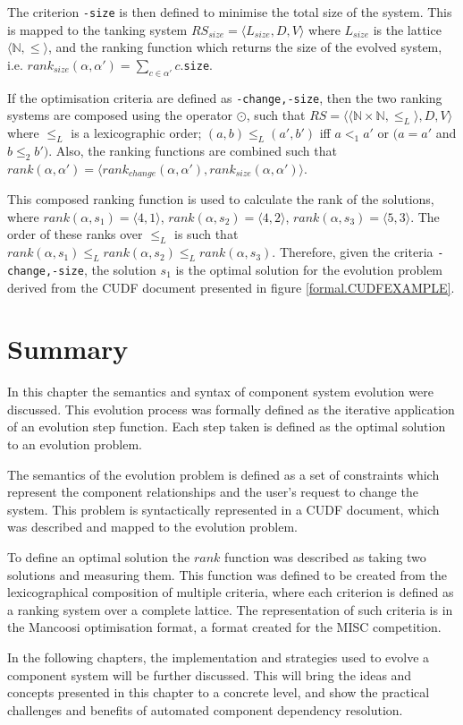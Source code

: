 The criterion \verb+-size+ is then defined to minimise the total size of the system.
This is mapped to the tanking system $RS_{size} = \langle L_{size},D,V \rangle$ where  $L_{size}$ is the lattice  $\langle \mathbb{N}, \leq \rangle$,
and the ranking function which returns the size of the evolved system, i.e.  $rank_{size}(\alpha,\alpha') = \sum_{c \in \alpha'} c$.\verb+size+.

If the optimisation criteria are defined as \verb+-change,-size+, then the two ranking systems are composed using the operator $\odot$,
such that $RS = \langle \langle \mathbb{N} \times \mathbb{N}, \leq_L \rangle, D, V \rangle$ where $\leq_L$ is a lexicographic order;
$(a,b) \leq_{L} (a',b')$ iff $a <_{1} a'$ or $(a = a'$ and $b \leq_{2} b')$.
Also, the ranking functions are combined such that $rank(\alpha,\alpha') = \langle rank_{change}(\alpha,\alpha'), rank_{size}(\alpha,\alpha') \rangle$.

This composed ranking function is used to calculate the rank of the solutions, where $rank(\alpha,s_1) = \langle 4, 1\rangle$, $rank(\alpha,s_2) = \langle 4, 2\rangle$, $rank(\alpha,s_3) = \langle 5, 3\rangle$.
The order of these ranks over $\leq_L$ is such that $rank(\alpha,s_1) \leq_L rank(\alpha,s_2) \leq_L rank(\alpha,s_3)$.
Therefore, given the criteria \verb+-change,-size+, the solution $s_1$ is the optimal solution for the evolution problem derived from the CUDF document presented in figure \ref{formal.CUDFEXAMPLE}.


\section{Summary}
In this chapter the semantics and syntax of component system evolution were discussed.
This evolution process was formally defined as the iterative application of an evolution step function.
Each step taken is defined as the optimal solution to an evolution problem.

The semantics of the evolution problem is defined as a set of constraints which represent the component relationships and the user's request to change the system.
This problem is syntactically represented in a CUDF document, which was described and mapped to the evolution problem. 

To define an optimal solution the $rank$ function was described as taking two solutions and measuring them.
This function was defined to be created from the lexicographical composition of multiple criteria,
where each criterion is defined as a ranking system over a complete lattice.
The representation of such criteria is in the Mancoosi optimisation format, a format created for the MISC competition.

In the following chapters, the implementation and strategies used to evolve a component system will be further discussed.
This will bring the ideas and concepts presented in this chapter to a concrete level, and show the practical challenges and benefits of automated component dependency resolution. 